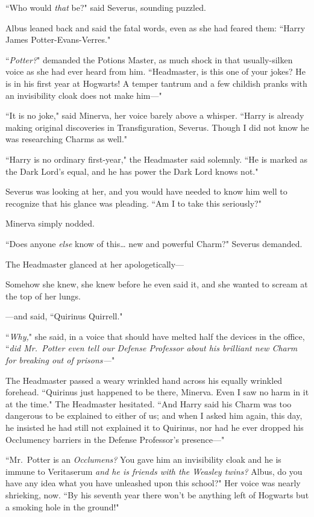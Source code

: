 ``Who would \emph{that} be?" said Severus, sounding puzzled.

Albus leaned back and said the fatal words, even as she had feared them: ``Harry James Potter-Evans-Verres."

``\emph{Potter?}" demanded the Potions Master, as much shock in that usually-silken voice as she had ever heard from him. ``Headmaster, is this one of your jokes? He is in his first year at Hogwarts! A temper tantrum and a few childish pranks with an invisibility cloak does not make him---"

``It is no joke," said Minerva, her voice barely above a whisper. ``Harry is already making original discoveries in Transfiguration, Severus. Though I did not know he was researching Charms as well."

``Harry is no ordinary first-year," the Headmaster said solemnly. ``He is marked as the Dark Lord's equal, and he has power the Dark Lord knows not."

Severus was looking at her, and you would have needed to know him well to recognize that his glance was pleading. ``Am I to take this seriously?"

Minerva simply nodded.

``Does anyone \emph{else} know of this{\ldots} new and powerful Charm?" Severus demanded.

The Headmaster glanced at her apologetically---

Somehow she knew, she knew before he even said it, and she wanted to scream at the top of her lungs.

---and said, ``Quirinus Quirrell."

``\emph{Why,}" she said, in a voice that should have melted half the devices in the office, ``\emph{did Mr.~Potter even \emph{tell} our Defense Professor about his brilliant new Charm for breaking out of prisons---}"

The Headmaster passed a weary wrinkled hand across his equally wrinkled forehead. ``Quirinus just happened to be there, Minerva. Even I saw no harm in it at the time." The Headmaster hesitated. ``And Harry said his Charm was too dangerous to be explained to either of us; and when I asked him again, this day, he insisted he had still not explained it to Quirinus, nor had he ever dropped his Occlumency barriers in the Defense Professor's presence---"

``Mr.~Potter is an \emph{Occlumens?} You gave him an invisibility cloak and he is immune to Veritaserum \emph{and he is friends with the Weasley twins?} Albus, do you have any idea what you have unleashed upon this school?" Her voice was nearly shrieking, now. ``By his seventh year there won't be anything left of Hogwarts but a smoking hole in the ground!"

